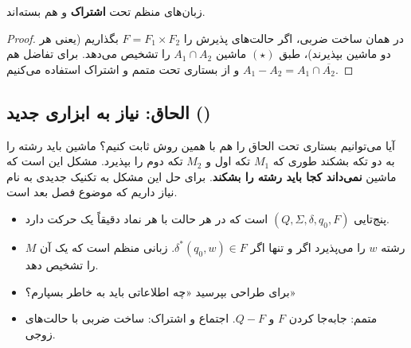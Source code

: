 \begin{corollary}
زبان‌های منظم تحت \textbf{اشتراک} و  هم بسته‌اند.
\end{corollary}
\begin{proof}
در همان ساخت ضربی، اگر حالت‌های پذیرش را $F=F_1\times F_2$ بگذاریم (یعنی هر دو ماشین بپذیرند)، طبق $(\star)$ ماشین $A_1\cap A_2$ را تشخیص می‌دهد. برای تفاضل هم $A_1-A_2=A_1\cap\overline{A_2}$ و از بستاری تحت متمم و اشتراک استفاده می‌کنیم.
\end{proof}

\subsection{الحاق: نیاز به ابزاری جدید ()}
آیا می‌توانیم بستاری تحت الحاق را هم با همین روش ثابت کنیم؟ ماشین باید رشته را به دو تکه بشکند طوری که $M_1$ تکه اول و $M_2$ تکه دوم را بپذیرد. مشکل این است که ماشین \textbf{نمی‌داند کجا باید رشته را بشکند}. برای حل این مشکل به تکنیک جدیدی به نام  نیاز داریم که موضوع فصل بعد است.

\begin{summary}
\begin{itemize}
\item {} پنج‌تایی $(Q,\Sigma,\delta,q_0,F)$ است که در هر حالت با هر نماد دقیقاً یک حرکت دارد.
\item $M$ رشته $w$ را می‌پذیرد اگر و تنها اگر $\delta^*(q_0,w)\in F$. زبانی منظم است که یک  آن را تشخیص دهد.
\item برای طراحی  بپرسید «چه اطلاعاتی باید به خاطر بسپارم؟»
\item متمم: جابه‌جا کردن $F$ و $Q-F$. اجتماع و اشتراک: ساخت ضربی با حالت‌های زوجی.
\end{itemize}
\end{summary}
